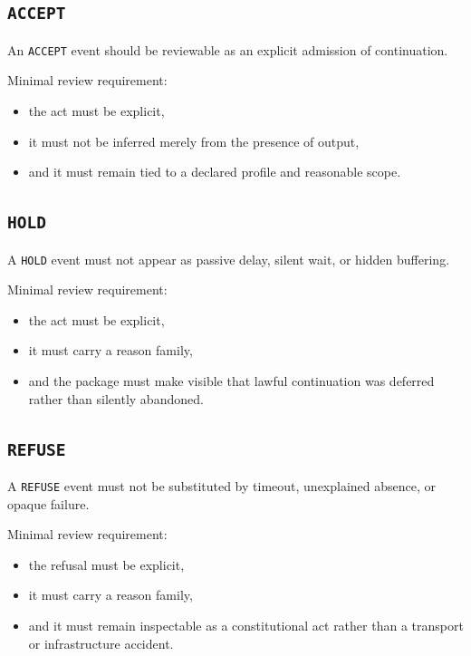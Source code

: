 \documentclass[11pt]{article}
\begin{document}
\subsection{\texttt{ACCEPT}}

An \texttt{ACCEPT} event should be reviewable as an explicit admission of continuation.

Minimal review requirement:
\begin{itemize}[leftmargin=2em]
    \item the act must be explicit,
    \item it must not be inferred merely from the presence of output,
    \item and it must remain tied to a declared profile and reasonable scope.
\end{itemize}

\subsection{\texttt{HOLD}}

A \texttt{HOLD} event must not appear as passive delay, silent wait, or hidden buffering.

Minimal review requirement:
\begin{itemize}[leftmargin=2em]
    \item the act must be explicit,
    \item it must carry a reason family,
    \item and the package must make visible that lawful continuation was deferred rather than silently abandoned.
\end{itemize}

\subsection{\texttt{REFUSE}}

A \texttt{REFUSE} event must not be substituted by timeout, unexplained absence, or opaque failure.

Minimal review requirement:
\begin{itemize}[leftmargin=2em]
    \item the refusal must be explicit,
    \item it must carry a reason family,
    \item and it must remain inspectable as a constitutional act rather than a transport or infrastructure accident.
\end{itemize}
\end{document}
